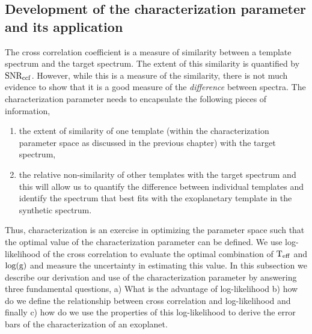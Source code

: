 \subsection{Development of the characterization parameter and its application}
The cross correlation coefficient is a measure of similarity between a template spectrum and the target spectrum.
The extent of this similarity is quantified by $\rm{SNR_{ccf}}$.
However, while this is a measure of the similarity, there is not much evidence to show that it is a good measure of the \textit{difference} between spectra.
The characterization parameter needs to encapsulate the following pieces of information,
\begin{enumerate}
    \item the extent of similarity of one template (within the characterization parameter space as discussed in the previous chapter) with the target spectrum,
    \item the relative non-similarity of other templates with the target spectrum and this will allow us to quantify the difference between individual templates and identify the spectrum that best fits with the exoplanetary template in the synthetic spectrum.
\end{enumerate}
Thus, characterization is an exercise in optimizing the parameter space such that the optimal value of the characterization parameter can be defined.
We use log-likelihood of the cross correlation to evaluate the optimal combination of $\rm{T_{eff}}$ and $\rm{\log(g)}$ and measure the uncertainty in estimating this value.
In this subsection we describe our derivation and use of the characterization parameter by answering three fundamental questions, a) What is the advantage of log-likelihood b) how do we define the relationship between cross correlation and log-likelihood and finally c) how do we use the properties of this log-likelihood to derive the error bars of the characterization of an exoplanet.

